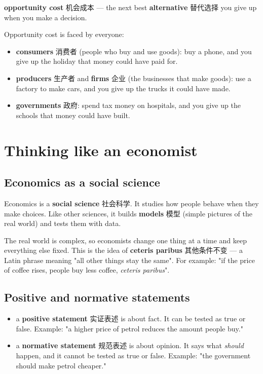 \documentclass[11pt]{article}
\begin{document}
\textbf{opportunity cost} 机会成本 — the next best \textbf{alternative} 替代选择 you give up when you make a decision.

Opportunity cost is faced by everyone:

\begin{itemize}
\item \textbf{consumers} 消费者 (people who buy and use goods): buy a phone, and you give up the holiday that money could have paid for.

\item \textbf{producers} 生产者 and \textbf{firms} 企业 (the businesses that make goods): use a factory to make cars, and you give up the trucks it could have made.

\item \textbf{governments} 政府: spend tax money on hospitals, and you give up the schools that money could have built.

\end{itemize}

\section*{Thinking like an economist}

\subsection*{Economics as a social science}

Economics is a \textbf{social science} 社会科学. It studies how people behave when they make choices. Like other sciences, it builds \textbf{models} 模型 (simple pictures of the real world) and tests them with data.

The real world is complex, so economists change one thing at a time and keep everything else fixed. This is the idea of \textbf{ceteris paribus} 其他条件不变 — a Latin phrase meaning "all other things stay the same". For example: "if the price of coffee rises, people buy less coffee, \emph{ceteris paribus}".

\subsection*{Positive and normative statements}

\begin{itemize}
\item a \textbf{positive statement} 实证表述 is about fact. It can be tested as true or false. Example: "a higher price of petrol reduces the amount people buy."

\item a \textbf{normative statement} 规范表述 is about opinion. It says what \emph{should} happen, and it cannot be tested as true or false. Example: "the government should make petrol cheaper."

\end{itemize}
\end{document}
